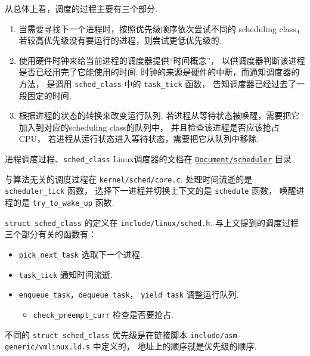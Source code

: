 从总体上看，调度的过程主要有三个部分.
\begin{enumerate}
	\item 当需要寻找下一个进程时，按照优先级顺序依次尝试不同的 scheduling class，
	      若较高优先级没有要运行的进程，则尝试更低优先级的.
	\item 使用硬件时钟来给当前进程的调度器提供“时间概念”，
	      以供调度器判断该进程是否已经用完了它能使用的时间.
	      时钟的来源是硬件的中断，而通知调度器的方法，
	      是调用 \lstinline{sched_class} 中的 \lstinline{task_tick} 函数，
	      告知调度器已经过去了一段固定的时间.
	\item 根据进程的状态的转换来改变运行队列.
	      若进程从等待状态被唤醒，需要把它加入到对应的scheduling class的队列中，
	      并且检查该进程是否应该抢占CPU，
	      若进程从运行状态进入等待状态，需要把它从队列中移除.
\end{enumerate}

\begin{readsrcbox}{进程调度过程、\lstinline{sched_class}}
	Linux调度器的文档在
	\href{https://docs.kernel.org/scheduler/index.html}{\lstinline{Document/scheduler}}
	目录.

	与算法无关的调度过程在 \lstinline{kernel/sched/core.c}.
	处理时间流逝的是 \lstinline{scheduler_tick} 函数，
	选择下一进程并切换上下文的是 \lstinline{schedule} 函数，
	唤醒进程的是 \lstinline{try_to_wake_up} 函数.

	\lstinline{struct sched_class} 的定义在 \lstinline{include/linux/sched.h}.
	与上文提到的调度过程三个部分有关的函数有：
	\begin{itemize}
		\item \lstinline{pick_next_task} 选取下一个进程.
		\item \lstinline{task_tick} 通知时间流逝.
		\item \lstinline{enqueue_task}，\lstinline{dequeue_task}，
		      \lstinline{yield_task} 调整运行队列.
		      \begin{itemize}
			      \item \lstinline{check_preempt_curr} 检查是否要抢占.
		      \end{itemize}
	\end{itemize}

	不同的 \lstinline{struct sched_class} 优先级是在链接脚本
	\lstinline{include/asm-generic/vmlinux.ld.s} 中定义的，
	地址上的顺序就是优先级的顺序.
\end{readsrcbox}

